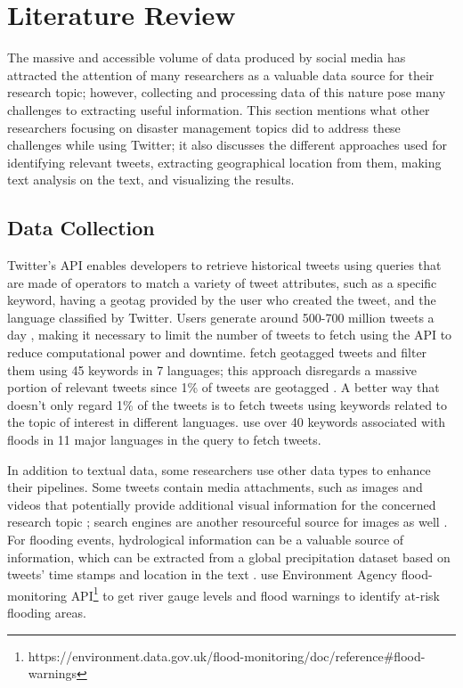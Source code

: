 \chapter{Literature Review}

The massive and accessible volume of data produced by social media has attracted the attention of
many researchers as a valuable data source for their research topic; however, collecting and
processing data of this nature pose many challenges to extracting useful information. This section
mentions what other researchers focusing on disaster management topics did to address these
challenges while using Twitter; it also discusses the different approaches used for identifying
relevant tweets, extracting geographical location from them, making text analysis on the text, and visualizing the results.

\section{Data Collection} 

Twitter's \ac{API} enables developers to retrieve historical tweets using queries that are made of
operators to match a variety of tweet attributes, such as a specific keyword, having a geotag
provided by the user who created the tweet, and the language classified by Twitter. Users generate
around 500-700 million tweets a day \cite{inproceedings}, making it necessary to limit the number of
tweets to fetch using the \ac{API} to reduce computational power and downtime.
 fetch geotagged tweets and filter them using 45 keywords
in 7 languages; this approach disregards a massive portion of relevant tweets since 1\% of tweets
are geotagged \cite{middletonRealTimeCrisisMapping2014}. A better way that doesn't only regard 1\%
of the tweets is to fetch tweets using keywords related to the topic of interest in different
languages.  use over 40 keywords associated with
floods in 11 major languages in the query to fetch tweets.

In addition to textual data, some researchers use other data types to enhance their pipelines. Some
tweets contain media attachments, such as images and videos that potentially provide additional
visual information for the concerned research topic
\cite{alamFloodDetectionTwitter2020}\cite{saidFloodsDetectionTwitter2020}\cite{ningPrototypingSocialMedia2020};
search engines are another resourceful source for images as well
\cite{fengExtractionPluvialFlood2018}. For flooding events, hydrological information can be a
valuable source of information, which can be extracted from a global precipitation dataset based on
tweets' time stamps and location in the text \cite{debruijnImprovingClassificationFlood2020}.
 use Environment Agency flood-monitoring
\ac{API}\footnote{https://environment.data.gov.uk/flood-monitoring/doc/reference\#flood-warnings} to
get river gauge levels and flood warnings to identify at-risk flooding areas.

